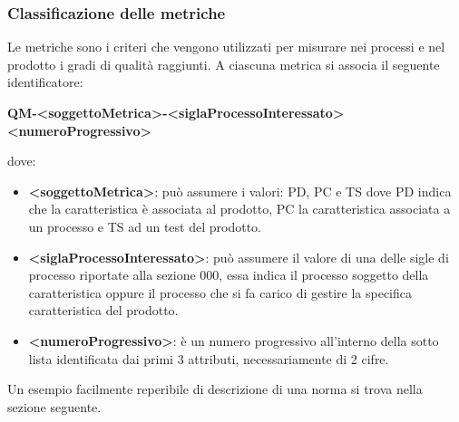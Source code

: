 		\subsubsection{Classificazione delle metriche}
			Le metriche sono i criteri che vengono utilizzati per misurare nei processi e nel prodotto i gradi di qualità raggiunti. A ciascuna metrica si associa il seguente identificatore:
			\begin{center}
				\textbf{QM-<soggettoMetrica>-<siglaProcessoInteressato><numeroProgressivo>}
			\end{center}
			dove:
			\begin{itemize}
				\item\textbf{<soggettoMetrica>}: può assumere i valori: PD, PC e TS dove PD indica che la caratteristica è associata al prodotto,  PC la caratteristica associata a un processo e TS ad un test del prodotto.
				\item\textbf{<siglaProcessoInteressato>}: può assumere il valore di una delle sigle di processo riportate alla sezione 000, essa indica il processo soggetto della caratteristica oppure il processo che si fa carico di gestire la specifica caratteristica del prodotto.
				\item\textbf{<numeroProgressivo>}: è un numero progressivo all’interno della sotto lista identificata dai primi 3 attributi, necessariamente di 2 cifre.
			\end{itemize}
			Un esempio facilmente reperibile di descrizione di una norma si trova nella sezione seguente.
